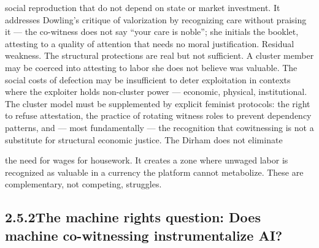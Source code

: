 social reproduction that do not depend on state or market investment. It addresses Dowling’s critique of valorization by recognizing care without praising it — the co-witness does not say “your care is noble”; she initials the booklet, attesting to a quality of attention that needs no moral justification. Residual weakness. The structural protections are real but not sufficient. A cluster member may be coerced into attesting to labor she does not believe was valuable. The social costs of defection may be insufficient to deter exploitation in contexts where the exploiter holds non-cluster power — economic, physical, institutional. The cluster model must be supplemented by explicit feminist protocols: the right to refuse attestation, the practice of rotating witness roles to prevent dependency patterns, and — most fundamentally — the recognition that cowitnessing is not a substitute for structural economic justice. The Dirham does not eliminate

the need for wages for housework. It creates a zone where unwaged labor is recognized as valuable in a currency the platform cannot metabolize. These are complementary, not competing, struggles.

\subsection{2.5.2\quad The machine rights question: Does machine co-witnessing instrumentalize AI?}

